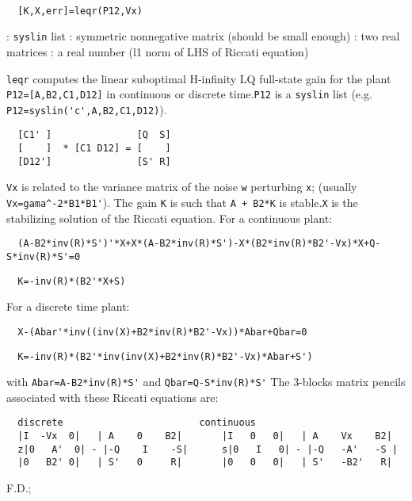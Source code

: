 \begin{mandesc}
   \\ %
\end{mandesc}
\begin{calling_sequence}
\begin{verbatim}
  [K,X,err]=leqr(P12,Vx)  
\end{verbatim}
\end{calling_sequence}
\begin{parameters}
  \begin{varlist}
    : \verb!syslin! list
    : symmetric nonnegative matrix (should be small enough)
    : two real matrices
    : a real number (l1 norm of LHS of Riccati equation)
  \end{varlist}
\end{parameters}
\begin{mandescription}
  \verb!leqr!  computes the linear suboptimal H-infinity LQ full-state gain
  for the plant \verb!P12=[A,B2,C1,D12]! in continuous or discrete time.\verb!P12! is a \verb!syslin! list (e.g. \verb!P12=syslin('c',A,B2,C1,D12)!).
\begin{verbatim}
  [C1' ]               [Q  S]
  [    ]  * [C1 D12] = [    ]
  [D12']               [S' R]
\end{verbatim}
\verb!Vx! is related to the variance matrix of the noise \verb!w! perturbing \verb!x!;
(usually \verb!Vx=gama^-2*B1*B1'!).
The gain \verb!K! is such that \verb!A + B2*K! is stable.\verb!X! is the stabilizing solution of the Riccati equation.
For a continuous plant:
\begin{verbatim}
  (A-B2*inv(R)*S')'*X+X*(A-B2*inv(R)*S')-X*(B2*inv(R)*B2'-Vx)*X+Q-S*inv(R)*S'=0
\end{verbatim}
\begin{verbatim}
  K=-inv(R)*(B2'*X+S)
\end{verbatim}
For a discrete time plant:
\begin{verbatim}
  X-(Abar'*inv((inv(X)+B2*inv(R)*B2'-Vx))*Abar+Qbar=0
\end{verbatim}
\begin{verbatim}
  K=-inv(R)*(B2'*inv(inv(X)+B2*inv(R)*B2'-Vx)*Abar+S')
\end{verbatim}
with \verb!Abar=A-B2*inv(R)*S'! and \verb!Qbar=Q-S*inv(R)*S'!
The 3-blocks matrix pencils associated with these Riccati equations are:
\begin{verbatim}
  discrete                        continuous
  |I  -Vx  0|   | A    0    B2|       |I   0   0|   | A    Vx    B2|
  z|0   A'  0| - |-Q    I    -S|      s|0   I   0| - |-Q   -A'   -S |
  |0   B2' 0|   | S'   0     R|       |0   0   0|   | S'   -B2'   R|
\end{verbatim}
\end{mandescription}
\begin{manseealso}
\end{manseealso}
\begin{authors}
  F.D.;   
\end{authors}
